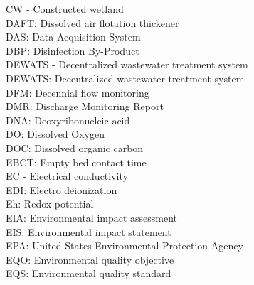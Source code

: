 CW - Constructed wetland
\vspace{0.3cm}\\
DAFT:  Dissolved air flotation thickener
\vspace{0.3cm}\\
DAS:  Data Acquisition System
\vspace{0.3cm}\\
DBP:  Disinfection By-Product
\vspace{0.3cm}\\
DEWATS - Decentralized wastewater treatment system
\vspace{0.3cm}\\
DEWATS:  Decentralized wastewater treatment system
\vspace{0.3cm}\\
DFM:  Decennial flow monitoring
\vspace{0.3cm}\\
DMR:  Discharge Monitoring Report
\vspace{0.3cm}\\
DNA:  Deoxyribonucleic acid
\vspace{0.3cm}\\
DO: Dissolved Oxygen
\vspace{0.3cm}\\
DOC:  Dissolved organic carbon
\vspace{0.3cm}\\
EBCT:  Empty bed contact time
\vspace{0.3cm}\\
EC - Electrical conductivity
\vspace{0.3cm}\\
EDI: Electro deionization
\vspace{0.3cm}\\
Eh:  Redox potential
\vspace{0.3cm}\\
EIA:  Environmental impact assessment
\vspace{0.3cm}\\
EIS:  Environmental impact statement
\vspace{0.3cm}\\
EPA:  United States Environmental Protection Agency
\vspace{0.3cm}\\
EQO:  Environmental quality objective
\vspace{0.3cm}\\
EQS:  Environmental quality standard
\vspace{0.3cm}\\
